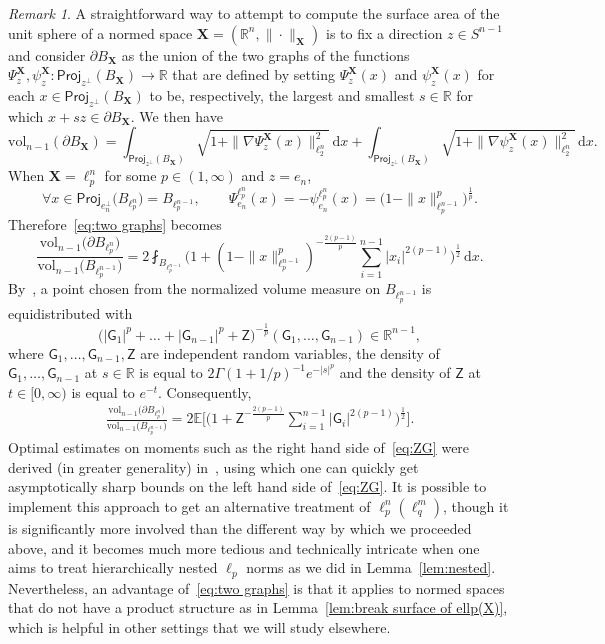\documentclass[11pt,reqno]{amsart}
\newcommand{\ud}[0]{\,\mathrm{d}}
\newcommand{\proj}{\mathsf{Proj}}
\newcommand{\X}{\mathbf X}
\newcommand{\R}{\mathbb R}
\theoremstyle{remark}
\newtheorem{remark}[theorem]{Remark}
\newcommand{\E}{\mathbb{ E}}
\newcommand{\vol}{\mathrm{vol}}
\renewcommand{\1}{\mathbf 1}
\newcommand{\sfG}{\mathsf{G}}
\newcommand{\sfZ}{\mathsf{Z}}
\begin{document}
\begin{remark} A straightforward way to attempt to compute  the surface area of the unit sphere of a normed space $\X=(\R^n,\|\cdot\|_\X)$  is to fix a direction $z\in S^{n-1}$ and consider $\partial B_\X$ as the union of the two graphs of the functions $\Psi_z^\X, \psi^\X_z: \proj_{z^\perp}(B_\X)\to \R$ that are defined by setting $\Psi_z^\X(x)$ and $\psi^\X_z(x)$ for each $x\in \proj_{z^\perp}(B_\X)$ to be, respectively, the largest and smallest $s\in \R$ for which $x+sz\in \partial B_{\X}$. We then have
\begin{equation}\label{eq:two graphs}
\vol_{n-1}(\partial B_{\X})=\int_{\proj_{z^\perp}(B_{\X})} \sqrt{1+\|\nabla \Psi_z^\X(x)\|_{\ell_2^n}^2}\ud x+\int_{\proj_{z^\perp}(B_{\X})} \sqrt{1+\|\nabla \psi_z^\X(x)\|_{\ell_2^n}^2}\ud x.
\end{equation}
When $\X=\ell_p^n$ for some $p\in (1,\infty)$ and $z=e_{n}$,
$$
\forall x\in \proj_{e_n^\perp}\big(B_{\ell_p^n}\big)= B_{\ell_p^{n-1}},\qquad \Psi^{\ell_p^n}_{e_n}(x)=-\psi^{\ell_p^n}_{e_n}(x)=\big(1-\|x\|_{\ell_p^{n-1}}^p\big)^{\frac{1}{p}}.
$$
Therefore~\eqref{eq:two graphs} becomes
\begin{equation*}
\frac{\vol_{n-1}\big(\partial B_{\ell_p^n}\big)}{\vol_{n-1}\big(B_{\ell_p^{n-1}}\big)}=2\fint_{B_{\ell_p^{n-1}}} \Big(1+(1-\|x\|_{\ell_p^{n-1}}^p)^{-\frac{2(p-1)}{p}} \sum_{i=1}^{n-1} |x_i|^{2(p-1)}\Big)^{\frac12}\ud x.
\end{equation*}
By~\cite{BGMN05}, a point chosen from the normalized volume measure on $B_{\ell_p^{n-1}}$  is equidistributed with
\begin{equation*}
\big(|\sfG_1|^p+\ldots+|\sfG_{n-1}|^p+\sfZ\big)^{-\frac{1}{p}}(\sfG_1,\ldots,\sfG_{n-1})\in \R^{n-1},
\end{equation*}
where $\sfG_1,\ldots,\sfG_{n-1},\sfZ$ are independent random variables, the density of $\sfG_1,\ldots,\sfG_{n-1}$ at $s\in \R$ is equal to $2\Gamma(1+1/p)^{-1} e^{-|s|^p}$ and the density of $\sfZ$ at $t\in [0,\infty)$ is equal to $e^{-t}$. Consequently,
\begin{align}\label{eq:ZG}
\frac{\vol_{n-1}\big(\partial B_{\ell_p^n}\big)}{\vol_{n-1}\big(B_{\ell_p^{n-1}}\big)}=2\E \bigg[\Big(1+\sfZ^{-\frac{2(p-1)}{p}}\sum_{i=1}^{n-1}|\sfG_i|^{2(p-1)}\Big)^{\frac12}\bigg].
\end{align}
Optimal estimates on moments such as the right hand side of~\eqref{eq:ZG}  were derived (in greater generality) in~\cite{Nao07}, using which one can quickly get asymptotically sharp bounds on the left hand side of~\eqref{eq:ZG}. It is possible to implement this approach to get an alternative treatment of $\ell_p^n(\ell_q^m)$, though it is significantly more involved than the different way by which we proceeded above, and it becomes much more tedious and technically intricate when one aims to treat hierarchically nested $\ell_p$ norms as we did in Lemma~\ref{lem:nested}. Nevertheless, an advantage of~\eqref{eq:two graphs} is that it applies to normed spaces that do not have a product structure as in Lemma~\ref{lem:break surface of ellp(X)}, which is helpful in other settings that we will study elsewhere.
\end{remark}
\end{document}
